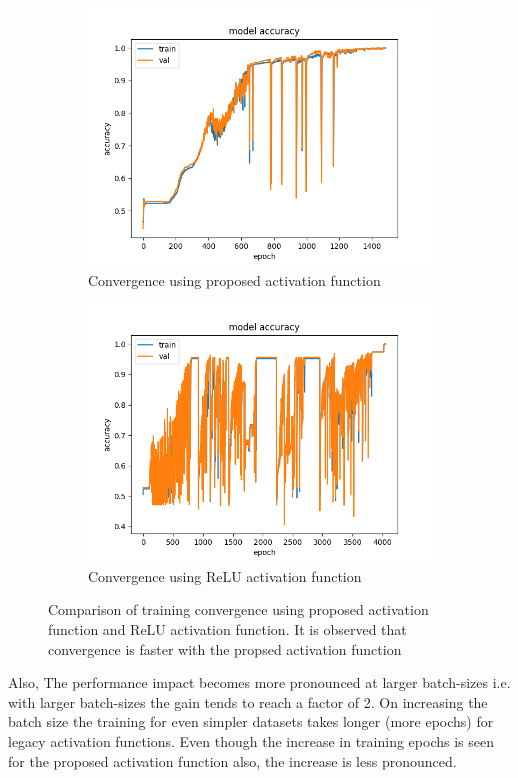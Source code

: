 \documentclass{bmvc2k}
\begin{document}
\begin{figure}[ht]
\begin{subfigure}{.5\textwidth}
  \centering
  \includegraphics[width=.8\linewidth]{images/accuracy_custom.png}
  \caption{Convergence using proposed activation function}
  \label{custom}
\end{subfigure}
\begin{subfigure}{.5\textwidth}
  \centering
  \includegraphics[width=.8\linewidth]{images/accuracy_legacy.png}
  \caption{Convergence using ReLU activation function}
  \label{legacy}
\end{subfigure}
\vspace{0.1in}
\caption{Comparison of training convergence using proposed activation function and ReLU activation function. It is observed that convergence is faster with the propsed activation function}
\label{accuracy}
\end{figure}
Also, The performance impact becomes more pronounced at larger batch-sizes i.e. with larger batch-sizes the gain tends to reach a factor of 2. On increasing the batch size the training for even simpler datasets takes longer (more epochs) for legacy activation functions. Even though the increase in training epochs  is seen for the proposed activation function also, the increase is less pronounced.
\end{document}
